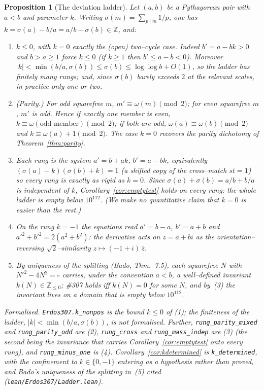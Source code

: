 \documentclass[11pt]{article}
\newtheorem{proposition}[theorem]{Proposition}
\theoremstyle{definition}
\begin{document}
\begin{proposition}[The deviation ladder]\label{prop:ladder}
Let $(a,b)$ be a Pythagorean pair with $a<b$ and parameter $k$. Writing
$\sigma(m)=\sum_{p\mid m}1/p$, one has $k=\sigma(a)-b/a=a/b-\sigma(b)\in\mathbb{Z}$, and:
\begin{enumerate}[label=\textup{(\arabic*)},leftmargin=2.2em]
\item $k\le0$, with $k=0$ exactly the \textup{(}open\textup{)} two--cycle case. Indeed $b'=a-bk>0$ and
$b>a\ge1$ force $k\le0$ \textup{(}if $k\ge1$ then $b'\le a-b<0$\textup{)}. Moreover
$|k|<\min(b/a,\sigma(b))\le\sigma(b)\le\log\log b+O(1)$, so the ladder has finitely many rungs; and,
since $\sigma(b)$ barely exceeds $2$ at the relevant scales, in practice only one or two.
\item \emph{(Parity.)} For odd squarefree $m$, $m'\equiv\omega(m)\pmod2$; for even squarefree $m$, $m'$
is odd. Hence if exactly one member is even, $k\equiv\omega(\text{odd member})\pmod2$; if both are odd,
$\omega(a)\equiv\omega(b)\pmod2$ and $k\equiv\omega(a)+1\pmod2$. The case $k=0$ recovers the parity
dichotomy of Theorem~\ref{thm:parity}.
\item Each rung is the system $a'=b+ak$, $b'=a-bk$, equivalently $(\sigma(a)-k)(\sigma(b)+k)=1$ (a
shifted copy of the cross--match $st=1$) so every rung is exactly as rigid as $k=0$. Since
$\sigma(a)+\sigma(b)=a/b+b/a$ is independent of $k$, Corollary~\ref{cor:emptytest} holds on \emph{every}
rung: the whole ladder is empty below $10^{112}$. (We make no quantitative claim that $k=0$ is easier
than the rest.)
\item On the rung $k=-1$ the equations read $a'=b-a$, $b'=a+b$ and $a'^2+b'^2=2(a^2+b^2)$: the
derivative acts on $z=a+bi$ as the orientation--reversing $\sqrt2$--similarity $z\mapsto(-1+i)\,\bar z$.
\item By uniqueness of the splitting \textup{(}Bado, Thm.~7.5\textup{)}, each squarefree $N$ with
$N'^2-4N^2=\square$ carries, under the convention $a<b$, a well--defined invariant
$k(N)\in\mathbb{Z}_{\le0}$; \#307 holds iff $k(N)=0$ for some $N$, and by~(3) the invariant lives on a
domain that is empty below $10^{112}$.
\end{enumerate}

\textup{Formalised.} \texttt{Erdos307.k\_nonpos} is the bound $k\le0$ of \textup{(1)}; the
finiteness of the ladder, $|k|<\min(b/a,\sigma(b))$, is not formalised. Further, \texttt{rung\_parity\_mixed} and
\texttt{rung\_parity\_odd} are \textup{(2)}, \texttt{rung\_cross} and \texttt{rung\_mass\_indep} are
\textup{(3)} \textup{(}the second being the invariance that carries
Corollary~\ref{cor:emptytest} onto every rung\textup{)}, and \texttt{rung\_minus\_one} is
\textup{(4)}. Corollary~\ref{cor:kdetermined} is \texttt{k\_determined}, with the confinement to
$k\in\{0,-1\}$ entering as a hypothesis rather than proved, and Bado's uniqueness of the splitting
in~\textup{(5)} cited \textup{(\texttt{lean/Erdos307/Ladder.lean})}.
\end{proposition}
\end{document}
